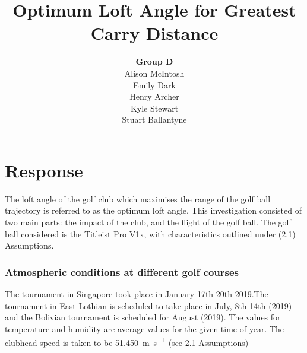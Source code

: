 \documentclass[12pt]{article}
\title{\textbf{Optimum Loft Angle for Greatest Carry Distance}}
\author{\textbf{Group D}\\
		Alison McIntosh\\
		Emily Dark\\
		Henry Archer\\
		Kyle Stewart\\
		Stuart Ballantyne}
\date{}
\begin{document}
\begin{titlepage}
\maketitle
\thispagestyle{empty}
\pagebreak
\end{titlepage}


\section{Response}
The loft angle of the golf club which maximises the range of the golf ball trajectory is referred to as the optimum loft angle. This investigation consisted of two main parts: the impact of the club, and the flight of the golf ball. The golf ball considered is the Titleist Pro V1x, with characteristics outlined under (2.1) Assumptions.

\subsubsection{Atmospheric conditions at different golf courses}
\begin{table}[H]
\caption{Atmospheric conditions at each golf course}
\label{tab:aconditions}
\end{table}

The tournament in Singapore took place in January 17th-20th 2019.The tournament in East Lothian is scheduled to take place in July, 8th-14th (2019) and the Bolivian tournament is scheduled for August (2019). The values for temperature and humidity are average values for the given time of year.
The clubhead speed is taken to be 51.4\SI{50}{\metre\per\second} (see 2.1 Assumptions)
\end{document}
